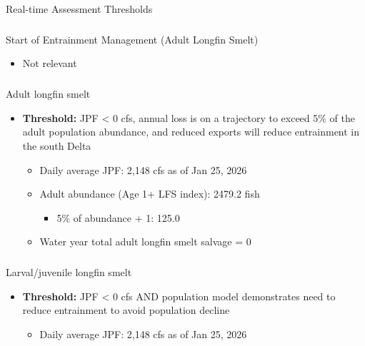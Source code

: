 \documentclass[
  letterpaper,
  DIV=11,
  numbers=noendperiod]{scrartcl}
\makeatletter
\let\oldparagraph\paragraph
\renewcommand{\paragraph}{
    \@ifstar
      \xxxParagraphStar
      \xxxParagraphNoStar
  }
\newcommand{\xxxParagraphStar}[1]{\oldparagraph*{#1}\mbox{}}
\newcommand{\xxxParagraphNoStar}[1]{\oldparagraph{#1}\mbox{}}
\let\oldsubparagraph\subparagraph
\renewcommand{\subparagraph}{
    \@ifstar
      \xxxSubParagraphStar
      \xxxSubParagraphNoStar
  }
\newcommand{\xxxSubParagraphStar}[1]{\oldsubparagraph*{#1}\mbox{}}
\newcommand{\xxxSubParagraphNoStar}[1]{\oldsubparagraph{#1}\mbox{}}
\providecommand{\tightlist}{%
  \setlength{\itemsep}{0pt}\setlength{\parskip}{0pt}}
\makeatother
\begin{document}
\paragraph{Real-time Assessment
Thresholds}\label{real-time-assessment-thresholds-1}

\subparagraph{Start of Entrainment Management (Adult Longfin
Smelt)}\label{start-of-entrainment-management-adult-longfin-smelt}

\begin{itemize}
\tightlist
\item
  Not relevant
\end{itemize}

\subparagraph{Adult longfin smelt}\label{adult-longfin-smelt}

\begin{itemize}
\tightlist
\item
  \textbf{Threshold:} JPF \textless{} 0 cfs, annual loss is on a
  trajectory to exceed 5\% of the adult population abundance, and
  reduced exports will reduce entrainment in the south Delta

  \begin{itemize}
  \tightlist
  \item
    Daily average JPF: 2,148 cfs as of Jan 25, 2026
  \item
    Adult abundance (Age 1+ LFS index): 2479.2 fish

    \begin{itemize}
    \tightlist
    \item
      5\% of abundance + 1: 125.0
    \end{itemize}
  \item
    Water year total adult longfin smelt salvage = 0
  \end{itemize}
\end{itemize}

\subparagraph{Larval/juvenile longfin
smelt}\label{larvaljuvenile-longfin-smelt}

\begin{itemize}
\tightlist
\item
  \textbf{Threshold:} JPF \textless{} 0 cfs AND population model
  demonstrates need to reduce entrainment to avoid population decline

  \begin{itemize}
  \tightlist
  \item
    Daily average JPF: 2,148 cfs as of Jan 25, 2026
  \end{itemize}
\end{itemize}
\end{document}
